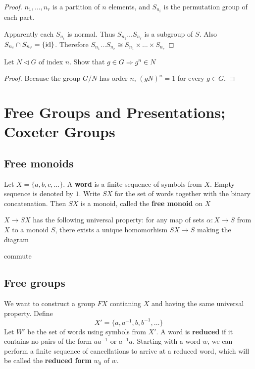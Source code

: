\documentclass[11pt]{article}
\begin{document}
\begin{proof}
\(n_1,\dots,n_r\) is a partition of \(n\) elements, and \(S_{n_i}\) is the permutation group of each
part.

Apparently each \(S_{n_i}\) is normal. Thus \(S_{n_1}\dots S_{n_r}\) is a subgroup of \(S\).
Also \(S_{n_i}\cap S_{n_j}=\{\operatorname{id}\}\). Therefore \(S_{n_1}\dots S_{n_r}\cong S_{n_1}\times\dots\times S_{n_r}\)
\end{proof}

\begin{exercise}
\label{ex1.5}
Let \(N\lhd G\) of index \(n\). Show that \(g\in G\Rightarrow g^n\in N\)
\end{exercise}

\begin{proof}
Because the group \(G/N\) has order \(n\), \((gN)^n=1\) for every \(g\in G\).
\end{proof}
\section{Free Groups and Presentations; Coxeter Groups}
\label{sec:org28ce7e1}
\subsection{Free monoids}
\label{sec:org030ec6d}
Let \(X=\{a,b,c,\dots\}\). A \textbf{word} is a finite sequence of symbols from \(X\). Empty sequence is
denoted by \(1\). Write \(SX\) for the set of words together with the binary concatenation.
Then \(SX\) is a monoid, called the \textbf{free monoid} on \(X\)

\(X\to SX\) has the following universal property: for any map of sets \(\alpha:X\to S\) from \(X\) to a
monoid \(S\), there exists a unique homomorhism \(SX\to S\) making the diagram
\begin{center}\end{center}
commute
\subsection{Free groups}
\label{sec:org65426d1}
We want to construct a group \(FX\) contianing \(X\) and having the same universal property.
Define
\begin{equation*}
X'=\{a,a^{-1},b,b^{-1},\dots\}
\end{equation*}
Let \(W'\) be the set of words using symbols from \(X'\). A word is \textbf{reduced} if it contains no
pairs of the form \(aa^{-1}\) or \(a^{-1}a\). Starting with a word \(w\), we can perform a
finite sequence of cancellations to arrive at a reduced word, which will be called the \textbf{reduced
form} \(w_0\) of \(w\).
\end{document}
